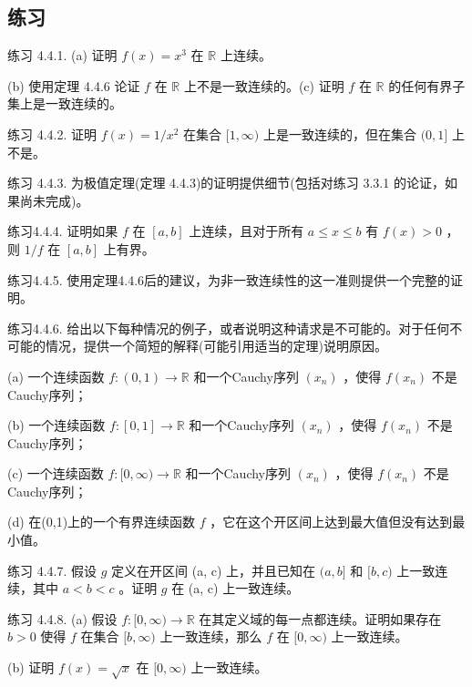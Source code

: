 \subsection{练习}

练习 4.4.1. (a) 证明 \(f\left( x\right)  = {x}^{3}\) 在 \(\mathbb{R}\) 上连续。

(b) 使用定理 4.4.6 论证 \(f\) 在 \(\mathbb{R}\) 上不是一致连续的。(c) 证明 \(f\) 在 \(\mathbb{R}\) 的任何有界子集上是一致连续的。

练习 4.4.2. 证明 \(f\left( x\right)  = 1/{x}^{2}\) 在集合 \(\lbrack 1,\infty )\) 上是一致连续的，但在集合 \((0,1\rbrack\) 上不是。

练习 4.4.3. 为极值定理(定理 4.4.3)的证明提供细节(包括对练习 3.3.1 的论证，如果尚未完成)。

练习4.4.4. 证明如果 \(f\) 在 \(\left\lbrack  {a,b}\right\rbrack\) 上连续，且对于所有 \(a \leq  x \leq  b\) 有 \(f\left( x\right)  > 0\) ，则 \(1/f\) 在 \(\left\lbrack  {a,b}\right\rbrack\) 上有界。

练习4.4.5. 使用定理4.4.6后的建议，为非一致连续性的这一准则提供一个完整的证明。

练习4.4.6. 给出以下每种情况的例子，或者说明这种请求是不可能的。对于任何不可能的情况，提供一个简短的解释(可能引用适当的定理)说明原因。

(a) 一个连续函数 \(f : \left( {0,1}\right)  \rightarrow  \mathbb{R}\) 和一个Cauchy序列 \(\left( {x}_{n}\right)\) ，使得 \(f\left( {x}_{n}\right)\) 不是Cauchy序列；

(b) 一个连续函数 \(f : \left\lbrack  {0,1}\right\rbrack   \rightarrow  \mathbb{R}\) 和一个Cauchy序列 \(\left( {x}_{n}\right)\) ，使得 \(f\left( {x}_{n}\right)\) 不是Cauchy序列；

(c) 一个连续函数 \(f : \lbrack 0,\infty ) \rightarrow  \mathbb{R}\) 和一个Cauchy序列 \(\left( {x}_{n}\right)\) ，使得 \(f\left( {x}_{n}\right)\) 不是Cauchy序列；

(d) 在(0,1)上的一个有界连续函数 \(f\) ，它在这个开区间上达到最大值但没有达到最小值。

练习 4.4.7. 假设 \(g\) 定义在开区间 (a, c) 上，并且已知在 \((a,b\rbrack\) 和 \(\lbrack b,c)\) 上一致连续，其中 \(a < b < c\) 。证明 \(g\) 在 (a, c) 上一致连续。

练习 4.4.8. (a) 假设 \(f : \lbrack 0,\infty ) \rightarrow  \mathbb{R}\) 在其定义域的每一点都连续。证明如果存在 \(b > 0\) 使得 \(f\) 在集合 \(\lbrack b,\infty )\) 上一致连续，那么 \(f\) 在 \(\lbrack 0,\infty )\) 上一致连续。

(b) 证明 \(f\left( x\right)  = \sqrt{x}\) 在 \(\lbrack 0,\infty )\) 上一致连续。

